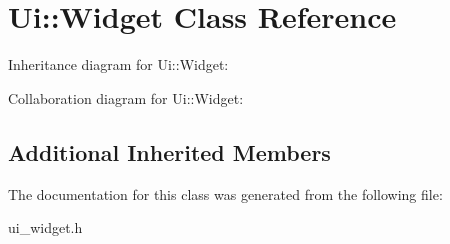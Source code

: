 \hypertarget{classUi_1_1Widget}{}\section{Ui\+:\+:Widget Class Reference}
\label{classUi_1_1Widget}


Inheritance diagram for Ui\+:\+:Widget\+:


Collaboration diagram for Ui\+:\+:Widget\+:
\subsection*{Additional Inherited Members}


The documentation for this class was generated from the following file\+:\begin{DoxyCompactItemize}
\item 
ui\+\_\+widget.\+h\end{DoxyCompactItemize}
